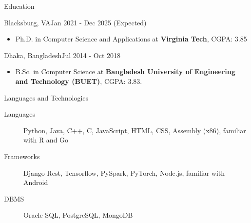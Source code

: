 \documentclass[]{mcdowellcv}
\begin{document}
	\begin{cvsection}{Education}
		\begin{cvsubsection}{Blacksburg, VA}{}{Jan 2021 - Dec 2025 (Expected)}
			\begin{itemize}
				\item Ph.D. in Computer Science and Applications at \textbf{Virginia Tech}, CGPA: 3.85
			\end{itemize}
		\end{cvsubsection}
		\begin{cvsubsection}{Dhaka, Bangladesh}{}{Jul 2014 - Oct 2018}
			\begin{itemize}
				\item B.Sc. in Computer Science at \textbf{Bangladesh University of Engineering and Technology (BUET)}, CGPA: 3.83.
			\end{itemize}
		\end{cvsubsection}
	\end{cvsection}

	\begin{cvsection}{Languages and Technologies}
		\begin{cvsubsection}{}{}{}
			\begin{description}
				\item[Languages] Python, Java, C++, C, JavaScript, HTML, CSS, Assembly (x86), familiar with R and Go
				\item[Frameworks] Django Rest, Tensorflow, PySpark, PyTorch, Node.js, familiar with Android
				\item[DBMS] Oracle SQL, PostgreSQL, MongoDB
			\end{description}
		\end{cvsubsection}
	\end{cvsection}
\end{document}
